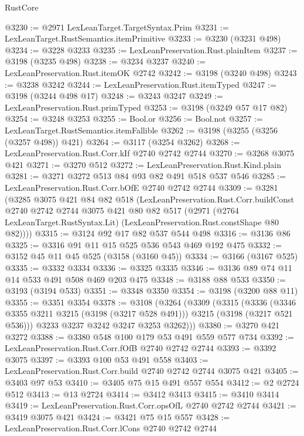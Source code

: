 \begin{lexlean}{RustCore}
\begin{coremodule}
@3230 := @2971 LexLeanTarget.TargetSyntax.Prim
@3231 := LexLeanTarget.RustSemantics.itemPrimitive
@3233 := @3230 (@3231 @498)
@3234 := @3228 @3233
@3235 := LexLeanPreservation.Rust.plainItem
@3237 := @3198 (@3235 @498)
@3238 := @3234 @3237
@3240 := LexLeanPreservation.Rust.itemOK @2742
@3242 := @3198 (@3240 @498)
@3243 := @3238 @3242
@3244 := LexLeanPreservation.Rust.itemTyped
@3247 := @3198 (@3244 @498 @17)
@3248 := @3243 @3247
@3249 := LexLeanPreservation.Rust.primTyped
@3253 := @3198 (@3249 @57 @17 @82)
@3254 := @3248 @3253
@3255 := Bool.or
@3256 := Bool.not
@3257 := LexLeanTarget.RustSemantics.itemFallible
@3262 := @3198 (@3255 (@3256 (@3257 @498)) @421)
@3264 := @3117 (@3254 @3262)
@3268 := LexLeanPreservation.Rust.Corr.kIf @2740 @2742 @2744
@3270 := @3268 @3075 @421
@3271 := @3270 @512
@3272 := LexLeanPreservation.Rust.Kind.plain
@3281 := @3271 @3272 @513 @84 @93 @82 @491 @518 @537 @546
@3285 := LexLeanPreservation.Rust.Corr.bOfE @2740 @2742 @2744
@3309 := @3281
    (@3285
      @3075
      @421
      @84
      @82
      @518
      (LexLeanPreservation.Rust.Corr.buildConst
        @2740
        @2742
        @2744
        @3075
        @421
        @80
        @82
        @517
        (@2971 (@2764 LexLeanTarget.RustSyntax.Lit) (LexLeanPreservation.Rust.constShape @80 @82))))
@3315 := @3124 @92 @17 @82 @537 @544 @498
@3316 := @3136 @86
@3325 := @3316 @91 @11 @15 @525 @536 @543 @469 @192 @475
@3332 := @3152 @45 @11 @45 @525 (@3158 (@3160 @45))
@3334 := @3166 (@3167 @525)
@3335 := @3332 @3334
@3336 := @3325 @3335
@3346 := @3136 @89 @74 @11 @14 @533 @491 @508 @469 @203 @475
@3348 := @3188 @88 @533
@3350 := @3193 (@3194 @533)
@3351 := @3348 @3350
@3354 := @3198 (@3200 @88 @11)
@3355 := @3351 @3354
@3378 := @3108
    (@3264
      (@3309
        (@3315
          (@3336
            (@3346 @3355 @3211 @3215 (@3198 (@3217 @528 @491)))
            @3215
            (@3198 (@3217 @521 @536)))
          @3233
          @3237
          @3242
          @3247
          @3253
          @3262)))
@3380 := @3270 @421 @3272
@3388 := @3380 @548 @100 @179 @53 @491 @559 @577 @734
@3392 := LexLeanPreservation.Rust.Corr.fOfB @2740 @2742 @2744
@3393 := @3392 @3075
@3397 := @3393 @100 @53 @491 @558
@3403 := LexLeanPreservation.Rust.Corr.build @2740 @2742 @2744 @3075 @421
@3405 := @3403 @97 @53
@3410 := @3405 @75 @15 @491 @557 @554
@3412 := @2 @2724 @512
@3413 := @13 @2724
@3414 := @3412 @3413
@3415 := @3410 @3414
@3419 := LexLeanPreservation.Rust.Corr.opsOfL @2740 @2742 @2744
@3421 := @3419 @3075 @421
@3424 := @3421 @75 @15 @557
@3428 := LexLeanPreservation.Rust.Corr.lCons @2740 @2742 @2744

\end{coremodule}
\end{lexlean}
